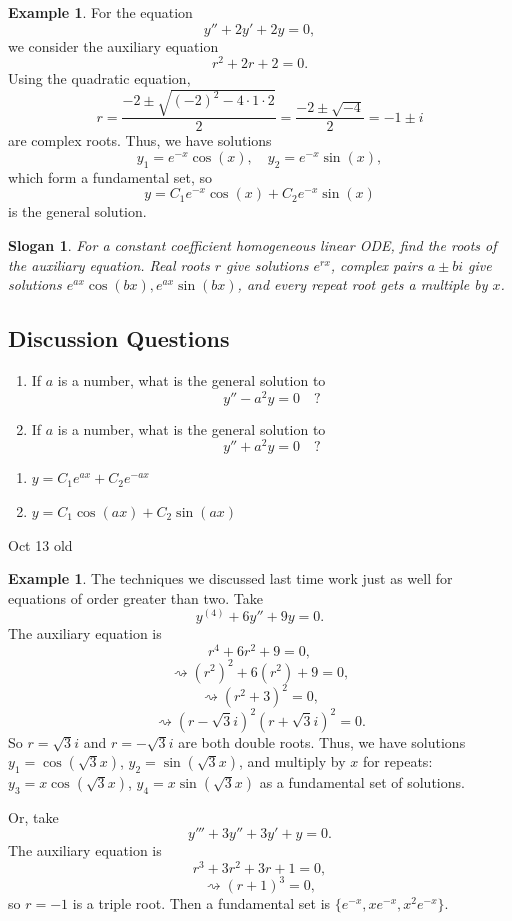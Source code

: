 \documentclass[12pt]{amsart}
\numberwithin{equation}{section}
\theoremstyle{plain} %
\newtheorem{slogan}[equation]{Slogan}
\newcommand{\Oct}[1]{Oct #1 old}
\newcommand{\rsa}{\rightsquigarrow}
\theoremstyle{definition}
\newtheorem{ex}[equation]{Example}
\theoremstyle{remark}
\begin{document}
\begin{ex}
For the equation
\[ y'' + 2y' +2y = 0,\]
we consider the auxiliary equation
\[ r^2 + 2r +2=0.\]
Using the quadratic equation,
\[ r = \frac{-2 \pm \sqrt{(-2)^2 - 4 \cdot 1 \cdot 2}}{2} = \frac{-2 \pm \sqrt{-4}}{2} = -1 \pm i\]
are complex roots. Thus, we have solutions 
\[ y_1 = e^{-x} \cos(x) , \quad y_2 = e^{-x} \sin(x),\]
which form a fundamental set, so
\[ y = C_1 e^{-x} \cos(x) + C_2 e^{-x} \sin(x)\]
is the general solution.
\end{ex}

\begin{slogan}
For a constant coefficient homogeneous linear ODE, find the roots of the auxiliary equation. Real roots $r$ give solutions $e^{rx}$, complex pairs $a\pm bi$ give solutions $e^{ax} \cos(bx) , e^{ax} \sin(bx)$, and every repeat root gets a multiple by $x$.
\end{slogan}


\subsection*{Discussion Questions}
\begin{enumerate}
\item If $a$ is a number, what is the general solution to
\[ y'' - a^2 y = 0\quad ?\]
\item If $a$ is a number, what is the general solution to
\[ y'' + a^2 y = 0\quad ?\]
\end{enumerate}
\begin{framed}
\begin{enumerate}
\item $y= C_1 e^{ax} + C_2 e^{-ax}$
\item $y= C_1 \cos(ax) + C_2 \sin(ax)$
\end{enumerate}
\end{framed}

\Oct{13}

\begin{ex} The techniques we discussed last time work just as well for equations of order greater than two. 
Take
\[ y^{(4)} + 6y'' + 9y = 0.\]
The auxiliary equation is 
\[ r^4 + 6 r^2 +9 = 0,\]
\[\rsa  (r^2)^2 + 6 (r^2) +9 = 0,\]
\[\rsa  (r^2 +3)^2 = 0,\]
\[\rsa  (r-\sqrt{3}i)^2(r+\sqrt{3}i)^2 = 0.\]
So $r=\sqrt{3} i $ and $r=-\sqrt{3}i$ are both double roots. Thus, we have
solutions $y_1= \cos(\sqrt{3} x)$, $y_2= \sin(\sqrt{3} x)$, and multiply by $x$ for repeats: $y_3= x \cos(\sqrt{3} x)$, $y_4= x \sin(\sqrt{3} x)$ as a fundamental set of solutions.

Or, take
\[ y''' + 3y'' + 3y' + y = 0.\]
The auxiliary equation is
\[ r^3 + 3r^2 + 3r + 1 = 0,\]
\[\rsa (r+1)^3 = 0,\]
so $r=-1$ is a triple root. Then a fundamental set is $\{ e^{-x}, x e^{-x}, x^2 e^{-x}\}$.
\end{ex}
\end{document}
